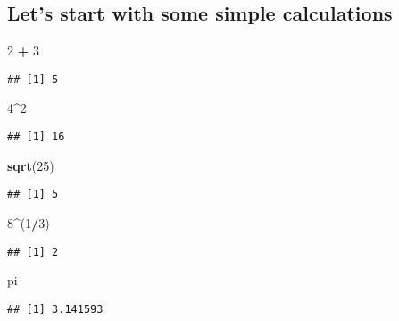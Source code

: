 \documentclass[
  a4paper,
]{article}
\newenvironment{Shaded}{\begin{snugshade}}{\end{snugshade}}
\newcommand{\DecValTok}[1]{\textcolor[rgb]{0.00,0.00,0.81}{#1}}
\newcommand{\FunctionTok}[1]{\textcolor[rgb]{0.13,0.29,0.53}{\textbf{#1}}}
\newcommand{\NormalTok}[1]{#1}
\newcommand{\SpecialCharTok}[1]{\textcolor[rgb]{0.81,0.36,0.00}{\textbf{#1}}}
\begin{document}
\subsection{Let's start with some simple
calculations}\label{lets-start-with-some-simple-calculations}

\begin{Shaded}
\begin{Highlighting}[]
\DecValTok{2} \SpecialCharTok{+} \DecValTok{3}
\end{Highlighting}
\end{Shaded}

\begin{verbatim}
## [1] 5
\end{verbatim}

\begin{Shaded}
\begin{Highlighting}[]
\DecValTok{4}\SpecialCharTok{\^{}}\DecValTok{2}
\end{Highlighting}
\end{Shaded}

\begin{verbatim}
## [1] 16
\end{verbatim}

\begin{Shaded}
\begin{Highlighting}[]
\FunctionTok{sqrt}\NormalTok{(}\DecValTok{25}\NormalTok{)}
\end{Highlighting}
\end{Shaded}

\begin{verbatim}
## [1] 5
\end{verbatim}

\begin{Shaded}
\begin{Highlighting}[]
\DecValTok{8}\SpecialCharTok{\^{}}\NormalTok{(}\DecValTok{1}\SpecialCharTok{/}\DecValTok{3}\NormalTok{)}
\end{Highlighting}
\end{Shaded}

\begin{verbatim}
## [1] 2
\end{verbatim}

\begin{Shaded}
\begin{Highlighting}[]
\NormalTok{pi}
\end{Highlighting}
\end{Shaded}

\begin{verbatim}
## [1] 3.141593
\end{verbatim}
\end{document}

